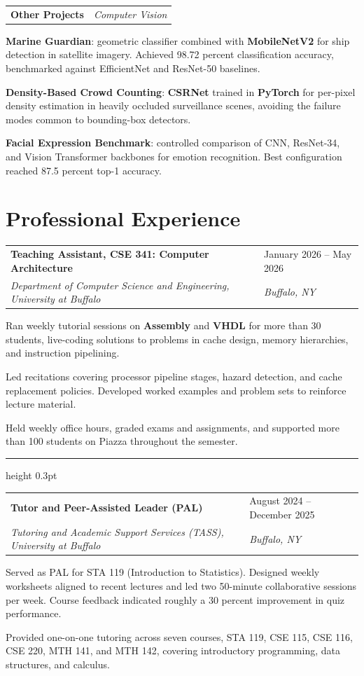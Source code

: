 \documentclass[11pt,a4paper]{article}
\makeatletter
\newcommand{\entrydivider}{%
  \vspace{4pt}%
  {\color{rulecolor}\hrule height 0.3pt}%
  \vspace{4pt}%
}
\newcommand{\roleentry}[4]{%
  \vspace{0.5em}%
  \begin{tabular*}{\textwidth}{@{\extracolsep{\fill}} ll}
    \textbf{#1} & #2 \\
    \textit{#3} & \textit{#4} \\
  \end{tabular*}%
  \vspace{0.15em}%
}
\newcommand{\projectentry}[2]{%
  \vspace{0.55em}%
  \begin{tabular*}{\textwidth}{@{\extracolsep{\fill}} ll}
    \textbf{#1} & \textit{#2} \\
  \end{tabular*}%
  \vspace{0.1em}%
}
\makeatother
\begin{document}
\projectentry{Other Projects}{Computer Vision}
\begin{cvlist}
  \item \textbf{Marine Guardian}: geometric classifier combined with \textbf{MobileNetV2} for ship detection in satellite imagery. Achieved 98.72 percent classification accuracy, benchmarked against EfficientNet and ResNet-50 baselines.
  \item \textbf{Density-Based Crowd Counting}: \textbf{CSRNet} trained in \textbf{PyTorch} for per-pixel density estimation in heavily occluded surveillance scenes, avoiding the failure modes common to bounding-box detectors.
  \item \textbf{Facial Expression Benchmark}: controlled comparison of CNN, ResNet-34, and Vision Transformer backbones for emotion recognition. Best configuration reached 87.5 percent top-1 accuracy.
\end{cvlist}

\section*{Professional Experience}

\roleentry{Teaching Assistant, CSE 341: Computer Architecture}{January 2026 -- May 2026}{Department of Computer Science and Engineering, University at Buffalo}{Buffalo, NY}
\begin{cvlist}
  \item Ran weekly tutorial sessions on \textbf{Assembly} and \textbf{VHDL} for more than 30 students, live-coding solutions to problems in cache design, memory hierarchies, and instruction pipelining.
  \item Led recitations covering processor pipeline stages, hazard detection, and cache replacement policies. Developed worked examples and problem sets to reinforce lecture material.
  \item Held weekly office hours, graded exams and assignments, and supported more than 100 students on Piazza throughout the semester.
\end{cvlist}

\entrydivider

\roleentry{Tutor and Peer-Assisted Leader (PAL)}{August 2024 -- December 2025}{Tutoring and Academic Support Services (TASS), University at Buffalo}{Buffalo, NY}
\begin{cvlist}
  \item Served as PAL for STA 119 (Introduction to Statistics). Designed weekly worksheets aligned to recent lectures and led two 50-minute collaborative sessions per week. Course feedback indicated roughly a 30 percent improvement in quiz performance.
  \item Provided one-on-one tutoring across seven courses, STA 119, CSE 115, CSE 116, CSE 220, MTH 141, and MTH 142, covering introductory programming, data structures, and calculus.
\end{cvlist}
\end{document}
